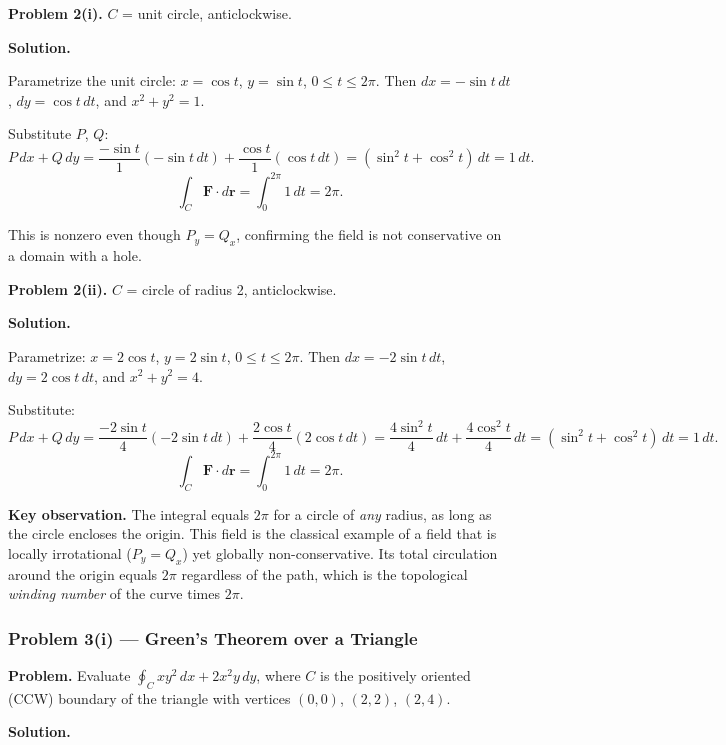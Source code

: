 \documentclass[11pt]{article}
\begin{document}
\medskip
\textbf{Problem 2(i).} $C$ = unit circle, anticlockwise.

\medskip
\textbf{Solution.}

Parametrize the unit circle: $x = \cos t$, $y = \sin t$, $0 \le t \le 2\pi$.
Then $dx = -\sin t\,dt$, $dy = \cos t\,dt$, and $x^2+y^2 = 1$.

Substitute $P$, $Q$:
\[
  P\,dx + Q\,dy
  = \frac{-\sin t}{1}(-\sin t\,dt) + \frac{\cos t}{1}(\cos t\,dt)
  = (\sin^2 t + \cos^2 t)\,dt = 1\,dt.
\]
\[
  \int_C \mathbf{F}\cdot d\mathbf{r}
  = \int_0^{2\pi} 1\,dt = \boxed{2\pi}.
\]

This is nonzero even though $P_y = Q_x$, confirming the field is not conservative on a domain with a hole.

\medskip
\textbf{Problem 2(ii).} $C$ = circle of radius 2, anticlockwise.

\medskip
\textbf{Solution.}

Parametrize: $x = 2\cos t$, $y = 2\sin t$, $0 \le t \le 2\pi$.
Then $dx = -2\sin t\,dt$, $dy = 2\cos t\,dt$, and $x^2+y^2 = 4$.

Substitute:
\[
  P\,dx + Q\,dy
  = \frac{-2\sin t}{4}(-2\sin t\,dt) + \frac{2\cos t}{4}(2\cos t\,dt)
  = \frac{4\sin^2 t}{4}\,dt + \frac{4\cos^2 t}{4}\,dt
  = (\sin^2 t + \cos^2 t)\,dt = 1\,dt.
\]
\[
  \int_C \mathbf{F}\cdot d\mathbf{r}
  = \int_0^{2\pi} 1\,dt = \boxed{2\pi}.
\]

\textbf{Key observation.} The integral equals $2\pi$ for a circle of \emph{any} radius, as long as the circle encloses the origin.
This field is the classical example of a field that is locally irrotational ($P_y=Q_x$) yet globally non-conservative.
Its total circulation around the origin equals $2\pi$ regardless of the path, which is the topological \emph{winding number} of the curve times $2\pi$.

\bigskip

\bigskip
\subsubsection*{Problem 3(i) --- Green's Theorem over a Triangle}

\textbf{Problem.}
Evaluate $\displaystyle\oint_C xy^2\,dx + 2x^2y\,dy$, where $C$ is the positively oriented (CCW) boundary of the triangle with vertices $(0,0)$, $(2,2)$, $(2,4)$.

\medskip
\textbf{Solution.}
\end{document}
